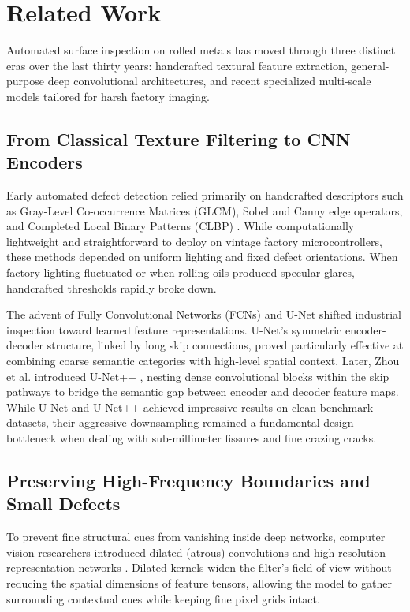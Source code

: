 \documentclass[10pt,a4paper]{article}
\begin{document}
\section{Related Work}
Automated surface inspection on rolled metals has moved through three distinct eras over the last thirty years: handcrafted textural feature extraction, general-purpose deep convolutional architectures, and recent specialized multi-scale models tailored for harsh factory imaging.

\subsection{From Classical Texture Filtering to CNN Encoders}
Early automated defect detection relied primarily on handcrafted descriptors such as Gray-Level Co-occurrence Matrices (GLCM), Sobel and Canny edge operators, and Completed Local Binary Patterns (CLBP) \cite{survey2024, neu2013}. While computationally lightweight and straightforward to deploy on vintage factory microcontrollers, these methods depended on uniform lighting and fixed defect orientations. When factory lighting fluctuated or when rolling oils produced specular glares, handcrafted thresholds rapidly broke down.

The advent of Fully Convolutional Networks (FCNs) and U-Net \cite{unet2015} shifted industrial inspection toward learned feature representations. U-Net's symmetric encoder-decoder structure, linked by long skip connections, proved particularly effective at combining coarse semantic categories with high-level spatial context. Later, Zhou et al. introduced U-Net++ \cite{unetpp2018}, nesting dense convolutional blocks within the skip pathways to bridge the semantic gap between encoder and decoder feature maps. While U-Net and U-Net++ achieved impressive results on clean benchmark datasets, their aggressive downsampling remained a fundamental design bottleneck when dealing with sub-millimeter fissures and fine crazing cracks.

\subsection{Preserving High-Frequency Boundaries and Small Defects}
To prevent fine structural cues from vanishing inside deep networks, computer vision researchers introduced dilated (atrous) convolutions and high-resolution representation networks \cite{deeplabv3plus}. Dilated kernels widen the filter's field of view without reducing the spatial dimensions of feature tensors, allowing the model to gather surrounding contextual cues while keeping fine pixel grids intact.
\end{document}
